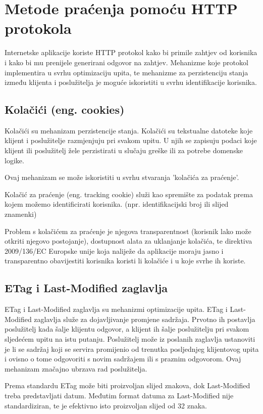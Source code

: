 \documentclass[times, utf8, zavrsni]{fer}
\begin{document}
\section{Metode praćenja pomoću HTTP protokola}
Internetske aplikacije koriste HTTP protokol kako bi primile zahtjev od
korisnika i kako bi mu prenijele generirani odgovor na zahtjev. Mehanizme koje
protokol implementira u svrhu optimizaciju upita, te mehanizme za perzistenciju
stanja između klijenta i poslužitelja je moguće iskoristiti u svrhu
identifikacije korisnika.

\subsection{Kolačići (eng. cookies)}
Kolačići su mehanizam perzistencije stanja.
Kolačići su tekstualne datoteke koje klijent i poslužitelje razmjenjuju pri
svakom upitu. U njih se zapisuju podaci koje klijent ili poslužitelj
žele perzistirati u slučaju greške ili za potrebe domenske logike.

Ovaj mehanizam se može iskoristiti u svrhu stvaranja 'kolačića za praćenje'.

Kolačić za praćenje (eng. tracking cookie) služi kao spremište za podatak
prema kojem možemo identificirati korisnika. (npr. identifikacijski broj ili
slijed znamenki)

Problem s kolačićem za praćenje je njegova transparentnost (korisnik
lako može otkriti njegovo postojanje), dostupnost alata za uklanjanje
kolačića, te direktiva 2009/136/EC Europske unije koja naliježe da
aplikacije moraju jasno i transparentno obavijestiti korisnika koristi li
kolačiće i u koje svrhe ih koriste.

\subsection{ETag i Last-Modified zaglavlja}
ETag i Last-Modified zaglavlja su mehanizmi optimizacije upita.
ETag i Last-Modified zaglavlja služe za dojavljivanje promjene sadržaja.
Prvotno ih postavlja poslužitelj kada šalje klijentu odgovor, a klijent ih
šalje poslužitelju pri svakom sljedećem upitu na istu putanju. Poslužitelj
može iz poslanih zaglavlja ustanoviti je li se sadržaj koji se servira
promijenio od trenutka posljednjeg klijentovog upita i ovisno o tome
odgovoriti s novim sadržajem ili s praznim odgovorom. Ovaj mehanizam
značajno ubrzava rad poslužitelja.

Prema standardu ETag može biti proizvoljan slijed znakova, dok Last-Modified
treba predstavljati datum. Međutim format datuma za Last-Modified nije
standardiziran, te je efektivno isto proizvoljan slijed od 32 znaka.
\end{document}
